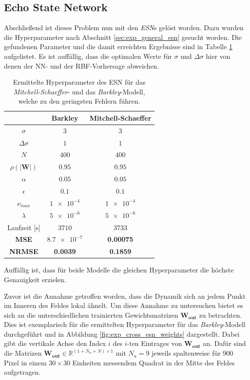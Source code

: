 \subsection{Echo State Network}
Abschließend ist dieses Problem nun mit den \textit{ESN}s gelöst worden. Dazu wurden die Hyperparameter nach Abschnitt \ref{sec:exp_general_esn} gesucht worden. Die gefundenen Parameter und die damit erreichten Ergebnisse sind in Tabelle \ref{tab:exp_cross_esn_results} aufgelistet. Es ist auffällig, dass die optimalen Werte für $\sigma$ und $\Delta \sigma$ hier von denen der NN- und der RBF-Vorhersage abweichen.
\begin{table}[h]
	\centering
	\captionsetup{width=0.9\linewidth}
	\begin{tabular}{ccc}
		\hline		
		\multicolumn{1}{c}{} &  Barkley & Mitchell-Schaeffer \\ 
		\hline 
		\rule[-1ex]{0pt}{2.5ex} $\sigma$ & $3$ & $3$ \\ 
		\rule[-1ex]{0pt}{2.5ex} $\Delta \sigma$ & $1$ & $1$ \\ 
		\rule[-1ex]{0pt}{3.5ex} $N$ & $400$ & $400$ \\ 
		\rule[-1ex]{0pt}{3.5ex} $\rho(|\mathbf{W}|)$ & $0.95$ & $0.95$\\ 
		\rule[-1ex]{0pt}{3.5ex} $\alpha$ & $0.05$ & $0.05$ \\ 
		\rule[-1ex]{0pt}{3.5ex} $\epsilon$ & $0.1$ & $0.1$ \\ 
		\rule[-1ex]{0pt}{3.5ex} $\nu_{max}$ & $\num{1e-4}$ & $\num{1e-4}$\\ 
		\rule[-1ex]{0pt}{3.5ex} $\lambda$ & $\num{5e-6}$ & $\num{5e-6}$\\ 
		\rule[-1ex]{0pt}{2.5ex} Laufzeit [s] & $3710$ & $3733$ \\ 
		\rule[-1ex]{0pt}{2.5ex} \textbf{MSE} & \textbf{$\num{8.7e-7}$} & \textbf{0.00075} \\ 
		\rule[-1ex]{0pt}{2.5ex} \textbf{NRMSE} & \textbf{0.0039} & \textbf{0.1859} \\ 
		\hline 
	\end{tabular} 
	\caption{Ermittelte Hyperparameter des \textsc{ESN} für das \textit{Mitchell-Schaeffer}- und das \textit{Barkley}-Modell, welche zu den geringsten Fehlern führen.}
	\label{tab:exp_cross_esn_results}
\end{table}

Auffällig ist, dass für beide Modelle die gleichen Hyperparameter die höchste Genauigkeit erzielen. 

Zuvor ist die Annahme getroffen worden, dass die Dynamik sich an jedem Punkt im Inneren des Feldes lokal ähnelt. Um diese Annahme zu untersuchen bietet es sich an die unterschiedlichen trainierten Gewichtsmatrizen $\mathbf{W_{out}}$ zu betrachten. Dies ist exemplarisch für die ermittelten Hyperparameter für das \textit{Barkley}-Modell durchgeführt und in Abbildung \ref{fig:exp_cross_esn_weights} dargestellt. Dabei gibt die vertikale Achse den Index $i$ des $i$-ten Eintrages von $\mathbf{W_{out}}$ an. Dafür sind die Matrizen $\mathbf{W_{out}} \in \mathbb{R}^{(1 + N_u + N) \times 1}$ mit $N_u = 9$ jeweils spaltenweise für $900$ Pixel in einem $30 \times 30$ Einheiten messendem Quadrat in der Mitte des Feldes aufgetragen.

